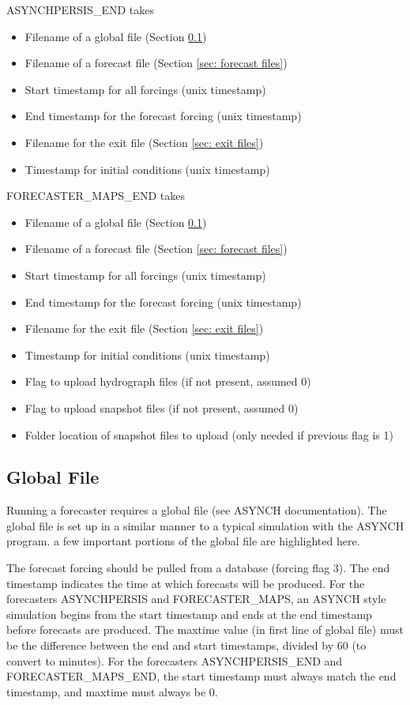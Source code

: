 \documentclass[12pt]{article}
\begin{document}
ASYNCHPERSIS\_END takes
\begin{itemize}
 \item Filename of a global file (Section \ref{sec: global file})
 \item Filename of a forecast file (Section \ref{sec: forecast files})
 \item Start timestamp for all forcings (unix timestamp)
 \item End timestamp for the forecast forcing (unix timestamp)
 \item Filename for the exit file (Section \ref{sec: exit files})
 \item Timestamp for initial conditions (unix timestamp)
\end{itemize}

FORECASTER\_MAPS\_END takes
\begin{itemize}
 \item Filename of a global file (Section \ref{sec: global file})
 \item Filename of a forecast file (Section \ref{sec: forecast files})
 \item Start timestamp for all forcings (unix timestamp)
 \item End timestamp for the forecast forcing (unix timestamp)
 \item Filename for the exit file (Section \ref{sec: exit files})
 \item Timestamp for initial conditions (unix timestamp)
 \item Flag to upload hydrograph files (if not present, assumed 0)
 \item Flag to upload snapshot files (if not present, assumed 0)
 \item Folder location of snapshot files to upload (only needed if previous flag is 1)
\end{itemize}


\subsection{Global File} \label{sec: global file}

Running a forecaster requires a global file (see ASYNCH documentation). The global file is set up in a similar manner to a typical simulation with the ASYNCH program. a few important portions of the global file are highlighted here.

The forecast forcing should be pulled from a database (forcing flag 3). The end timestamp indicates the time at which forecasts will be produced. For the forecasters ASYNCHPERSIS and FORECASTER\_MAPS, an ASYNCH style simulation begins from the start timestamp and ends at the end timestamp before forecasts are produced. The maxtime value (in first line of global file) must be the difference between the end and start timestamps, divided by 60 (to convert to minutes). For the forecasters ASYNCHPERSIS\_END and FORECASTER\_MAPS\_END, the start timestamp must always match the end timestamp, and maxtime must always be 0.
\end{document}
